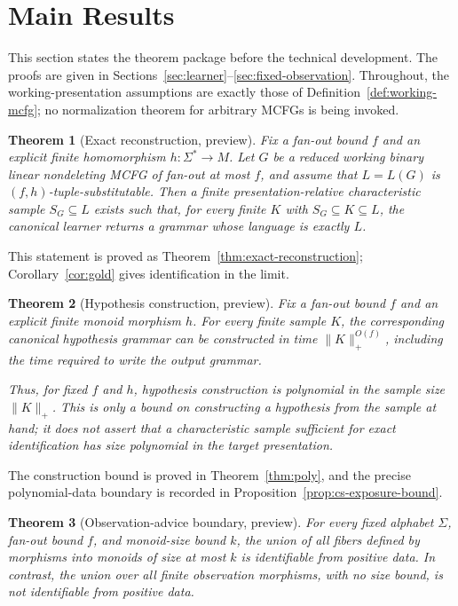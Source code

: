 \documentclass[11pt,a4paper]{article}
\newtheorem{theorem}{Theorem}[section]
\theoremstyle{remark}
\begin{document}
\section{Main Results}
\label{sec:main-results}

This section states the theorem package before the technical development.  The
proofs are given in Sections~\ref{sec:learner}--\ref{sec:fixed-observation}.
Throughout, the working-presentation assumptions are exactly those of
Definition~\ref{def:working-mcfg}; no normalization theorem for arbitrary MCFGs
is being invoked.

\begin{theorem}[Exact reconstruction, preview]
\label{thm:main-exact-preview}
Fix a fan-out bound \(f\) and an explicit finite homomorphism
\(h:\Sigma^*\to M\).  Let \(G\) be a reduced working binary linear
nondeleting MCFG of fan-out at most \(f\), and assume that
\(L=L(G)\) is \((f,h)\)-tuple-substitutable.  Then a finite
presentation-relative characteristic sample \(S_G\subseteq L\) exists such
that, for every finite \(K\) with \(S_G\subseteq K\subseteq L\), the canonical
learner returns a grammar whose language is exactly \(L\).
\end{theorem}

This statement is proved as Theorem~\ref{thm:exact-reconstruction};
Corollary~\ref{cor:gold} gives identification in the limit.

\begin{theorem}[Hypothesis construction, preview]
\label{thm:main-poly-preview}
Fix a fan-out bound \(f\) and an explicit finite monoid morphism \(h\).  For
every finite sample \(K\), the corresponding canonical hypothesis grammar can
be constructed in time \(\|K\|_+^{O(f)}\), including the time required to
write the output grammar.

Thus, for fixed \(f\) and \(h\), hypothesis construction is polynomial in the
sample size \(\|K\|_+\).  This is only a bound on constructing a hypothesis
from the sample at hand; it does not assert that a characteristic sample
sufficient for exact identification has size polynomial in the target
presentation.
\end{theorem}

The construction bound is proved in Theorem~\ref{thm:poly}, and the precise
polynomial-data boundary is recorded in
Proposition~\ref{prop:cs-exposure-bound}.

\begin{theorem}[Observation-advice boundary, preview]
\label{thm:main-advice-preview}
For every fixed alphabet \(\Sigma\), fan-out bound \(f\), and monoid-size bound
\(k\), the union of all fibers defined by morphisms into monoids of size at
most \(k\) is identifiable from positive data.  In contrast, the union over
all finite observation morphisms, with no size bound, is not identifiable from
positive data.
\end{theorem}
\end{document}
